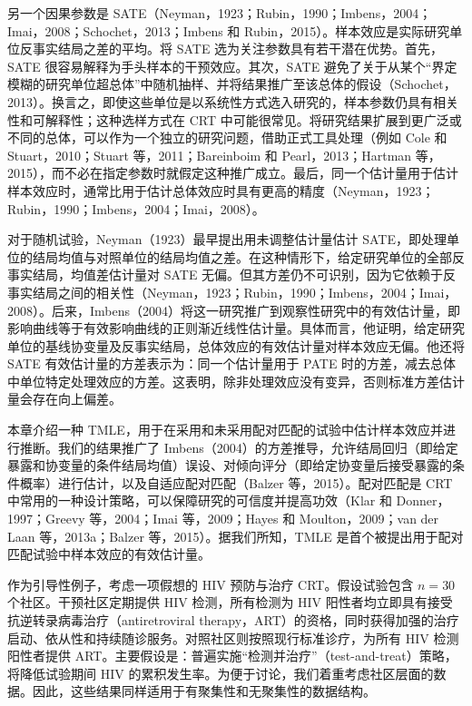 另一个因果参数是 SATE（Neyman，1923；Rubin，1990；Imbens，2004；Imai，2008；Schochet，2013；Imbens 和 Rubin，2015）。样本效应是实际研究单位反事实结局之差的平均。将 SATE 选为关注参数具有若干潜在优势。首先，SATE 很容易解释为手头样本的干预效应。其次，SATE 避免了关于从某个“界定模糊的研究单位超总体”中随机抽样、并将结果推广至该总体的假设（Schochet，2013）。换言之，即使这些单位是以系统性方式选入研究的，样本参数仍具有相关性和可解释性；这种选样方式在 CRT 中可能很常见。将研究结果扩展到更广泛或不同的总体，可以作为一个独立的研究问题，借助正式工具处理（例如 Cole 和 Stuart，2010；Stuart 等，2011；Bareinboim 和 Pearl，2013；Hartman 等，2015），而不必在指定参数时就假定这种推广成立。最后，同一个估计量用于估计样本效应时，通常比用于估计总体效应时具有更高的精度（Neyman，1923；Rubin，1990；Imbens，2004；Imai，2008）。

对于随机试验，Neyman（1923）最早提出用未调整估计量估计 SATE，即处理单位的结局均值与对照单位的结局均值之差。在这种情形下，给定研究单位的全部反事实结局，均值差估计量对 SATE 无偏。但其方差仍不可识别，因为它依赖于反事实结局之间的相关性（Neyman，1923；Rubin，1990；Imbens，2004；Imai，2008）。后来，Imbens（2004）将这一研究推广到观察性研究中的有效估计量，即影响曲线等于有效影响曲线的正则渐近线性估计量。具体而言，他证明，给定研究单位的基线协变量及反事实结局，总体效应的有效估计量对样本效应无偏。他还将 SATE 有效估计量的方差表示为：同一个估计量用于 PATE 时的方差，减去总体中单位特定处理效应的方差。这表明，除非处理效应没有变异，否则标准方差估计量会存在向上偏差。

\begin{sourcebox}
本章介绍一种 TMLE，用于在采用和未采用配对匹配的试验中估计样本效应并进行推断。我们的结果推广了 Imbens（2004）的方差推导，允许结局回归（即给定暴露和协变量的条件结局均值）误设、对倾向评分（即给定协变量后接受暴露的条件概率）进行估计，以及自适应配对匹配（Balzer 等，2015）。配对匹配是 CRT 中常用的一种设计策略，可以保障研究的可信度并提高功效（Klar 和 Donner，1997；Greevy 等，2004；Imai 等，2009；Hayes 和 Moulton，2009；van der Laan 等，2013a；Balzer 等，2015）。据我们所知，TMLE 是首个被提出用于配对匹配试验中样本效应的有效估计量。
\end{sourcebox}

作为引导性例子，考虑一项假想的 HIV 预防与治疗 CRT。假设试验包含 $n=30$ 个社区。干预社区定期提供 HIV 检测，所有检测为 HIV 阳性者均立即具有接受抗逆转录病毒治疗（antiretroviral therapy，ART）的资格，同时获得加强的治疗启动、依从性和持续随诊服务。对照社区则按照现行标准诊疗，为所有 HIV 检测阳性者提供 ART。主要假设是：普遍实施“检测并治疗”（test-and-treat）策略，将降低试验期间 HIV 的累积发生率。为便于讨论，我们着重考虑社区层面的数据。因此，这些结果同样适用于有聚集性和无聚集性的数据结构。


